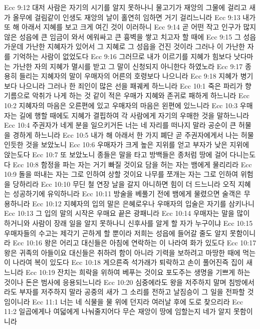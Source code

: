 Ecc 9:12  대저 사람은 자기의 시기를 알지 못하나니 물고기가 재앙의 그물에 걸리고 새가 올무에 걸림같이 인생도 재앙의 날이 홀연히 임하면 거기 걸리느니라
Ecc 9:13  내가 또 해 아래서 지혜를 보고 크게 여긴 것이 이러하니
Ecc 9:14  곧 어떤 작고 인구가 많지 않은 성읍에 큰 임금이 와서 에워싸고 큰 흉벽을 쌓고 치고자 할 때에
Ecc 9:15  그 성읍 가운데 가난한 지혜자가 있어서 그 지혜로 그 성읍을 건진 것이라 그러나 이 가난한 자를 기억하는 사람이 없었도다
Ecc 9:16  그러므로 내가 이르기를 지혜가 힘보다 낫다마는 가난한 자의 지혜가 멸시를 받고 그 말이 신청되지 아니한다 하였노라
Ecc 9:17  종용히 들리는 지혜자의 말이 우매자의 어른의 호령보다 나으니라
Ecc 9:18  지혜가 병기보다 나으니라 그러나 한 죄인이 많은 선을 패궤케 하느니라
Ecc 10:1  죽은 파리가 향기름으로 악취가 나게 하는 것 같이 적은 우매가 지혜와 존귀로 패하게 하느니라
Ecc 10:2  지혜자의 마음은 오른편에 있고 우매자의 마음은 왼편에 있느니라
Ecc 10:3  우매자는 길에 행할 때에도 지혜가 결핍하여 각 사람에게 자기의 우매한 것을 말하느니라
Ecc 10:4  주권자가 네게 분을 일으키거든 너는 네 자리를 떠나지 말라 공순이 큰 허물을 경하게 하느니라
Ecc 10:5  내가 해 아래서 한 가지 폐단 곧 주권자에게서 나는 허물인듯한 것을 보았노니
Ecc 10:6  우매자가 크게 높은 지위를 얻고 부자가 낮은 지위에 앉는도다
Ecc 10:7  또 보았노니 종들은 말을 타고 방백들은 종처럼 땅에 걸어 다니는도다
Ecc 10:8  함정을 파는 자는 거기 빠질 것이요 담을 허는 자는 뱀에게 물리리라
Ecc 10:9  돌을 떠내는 자는 그로 인하여 상할 것이요 나무를 쪼개는 자는 그로 인하여 위험을 당하리라
Ecc 10:10  무딘 철 연장 날을 갈지 아니하면 힘이 더 드느니라 오직 지혜는 성공하기에 유익하니라
Ecc 10:11  방술을 베풀기 전에 뱀에게 물렸으면 술객은 무용하니라
Ecc 10:12  지혜자의 입의 말은 은혜로우나 우매자의 입술은 자기를 삼키나니
Ecc 10:13  그 입의 말의 시작은 우매요 끝은 광패니라
Ecc 10:14  우매자는 말을 많이 하거니와 사람이 장래 일을 알지 못하나니 신후사를 알게 할 자가 누구이냐
Ecc 10:15  우매자들의 수고는 제각기 곤하게 할 뿐이라 저희는 성읍에 들어갈 줄도 알지 못함이니라
Ecc 10:16  왕은 어리고 대신들은 아침에 연락하는 이 나라여 화가 있도다
Ecc 10:17  왕은 귀족의 아들이요 대신들은 취하려 함이 아니라 기력을 보하려고 마땅한 때에 먹는 이 나라여 복이 있도다
Ecc 10:18  게으른즉 석가래가 퇴락하고 손이 풀어진즉 집이 새느니라
Ecc 10:19  잔치는 희락을 위하여 베푸는 것이요 포도주는 생명을 기쁘게 하는 것이나 돈은 범사에 응용되느니라
Ecc 10:20  심중에라도 왕을 저주하지 말며 침방에서라도 부자를 저주하지 말라 공중의 새가 그 소리를 전하고 날짐승이 그 일을 전파할 것임이니라
Ecc 11:1  너는 네 식물을 물 위에 던지라 여러날 후에 도로 찾으리라
Ecc 11:2  일곱에게나 여덟에게 나눠줄지어다 무슨 재앙이 땅에 임할는지 네가 알지 못함이니라
